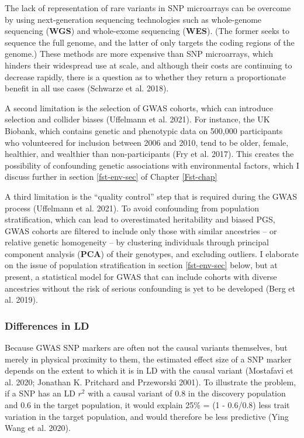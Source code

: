 \documentclass[
]{book}
\begin{document}
The lack of representation of rare variants in SNP microarrays can be overcome by using next-generation sequencing technologies such as whole-genome sequencing (\textbf{WGS}) and whole-exome sequencing (\textbf{WES}). (The former seeks to sequence the full genome, and the latter of only targets the coding regions of the genome.) These methods are more expensive than SNP microarrays, which hinders their widespread use at scale, and although their costs are continuing to decrease rapidly, there is a question as to whether they return a proportionate benefit in all use cases (Schwarze et al. 2018).

A second limitation is the selection of GWAS cohorts, which can introduce selection and collider biases (Uffelmann et al. 2021). For instance, the UK Biobank, which contains genetic and phenotypic data on 500,000 participants who volunteered for inclusion between 2006 and 2010, tend to be older, female, healthier, and wealthier than non-participants (Fry et al. 2017). This creates the possibility of confounding genetic associations with environmental factors, which I discuss further in section \ref{fst-env-sec} of Chapter \ref{Fst-chap}

A third limitation is the ``quality control'' step that is required during the GWAS process (Uffelmann et al. 2021). To avoid confounding from population stratification, which can lead to overestimated heritability and biased PGS, GWAS cohorts are filtered to include only those with similar ancestries -- or relative genetic homogeneity -- by clustering individuals through principal component analysis (\textbf{PCA}) of their genotypes, and excluding outliers. I elaborate on the issue of population stratification in section \ref{fst-env-sec} below, but at present, a statistical model for GWAS that can include cohorts with diverse ancestries without the risk of serious confounding is yet to be developed (Berg et al. 2019).

\hypertarget{differences-in-ld}{%
\subsubsection{Differences in LD}\label{differences-in-ld}}

Because GWAS SNP markers are often not the causal variants themselves, but merely in physical proximity to them, the estimated effect size of a SNP marker depends on the extent to which it is in LD with the causal variant (Mostafavi et al. 2020; Jonathan K. Pritchard and Przeworski 2001). To illustrate the problem, if a SNP has an LD \(r^2\) with a causal variant of 0.8 in the discovery population and 0.6 in the target population, it would explain 25\% = (1 - 0.6/0.8) less trait variation in the target population, and would therefore be less predictive (Ying Wang et al. 2020).
\end{document}
